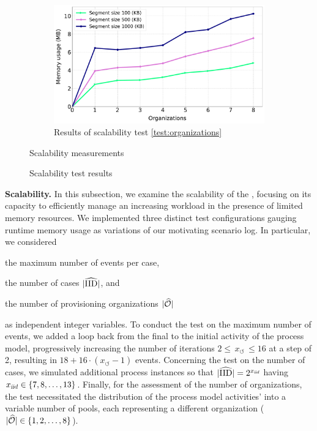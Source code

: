 \begin{figure}[t]
	\begin{subfigure}{0.49\textwidth}   
		\centering
		\includegraphics[width=\textwidth]{content/figures/organizationstest-2.pdf}
		\caption{Results of scalability test \ref{test:organizations}}
		\label{fig:org_results}
	\end{subfigure}
	\begin{subtable}{0.49\textwidth}
		\centering
		\resizebox{0.97\textwidth}{!}{%
			
		}
		\label{table:TestCoefficentTable}
		\caption{Scalability measurements}
	\end{subtable}
	\caption{Scalability test results}
	\label{fig:scalabtest}
\end{figure}
\noindent\textbf{Scalability.}
In this subsection, we examine the scalability of the , focusing on its capacity to efficiently manage an increasing workload in the presence of limited memory resources. We implemented three distinct test configurations gauging runtime memory usage as variations of our motivating scenario log. In particular, we considered
\begin{inparaenum}[(I)]
	\item\label{test:events} the maximum number of events per case,
	\item\label{test:cases} the number of cases $|{\widehat{\mathrm{IID}}}|$, and 
	\item\label{test:organizations} the number of provisioning organizations $|{\widehat{\mathcal{O}}}|$
\end{inparaenum}
as independent integer variables. To conduct the test on the maximum number of events, we added a loop back from the final to the initial activity of the process model, progressively increasing the number of iterations $2 \leqslant \,x_\circlearrowleft\, \leqslant 16$ at a step of \num{2}, resulting in $18+16\cdot(x_\circlearrowleft-1)$ events. Concerning the test on the number of cases, we simulated additional process instances so that $|{\widehat{\mathrm{IID}}}| = 2^{x_{\textrm{\textsl{iid}}}}$ having $x_{\textrm{\textsl{iid}}} \in \{7,8,\ldots,13\}$. Finally, for the assessment of the number of organizations, the test necessitated the distribution of the process model activities' into a variable number of pools, each representing a different organization ($|{\widehat{\mathcal{O}}}| \in \{1,2,\ldots,8\}$).
